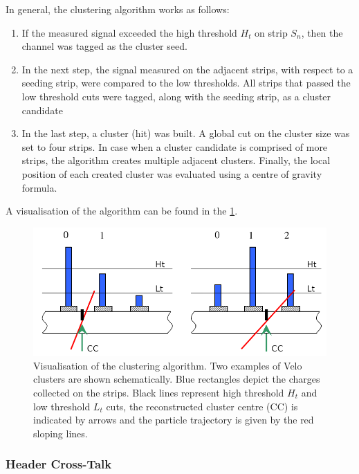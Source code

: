 In general, the clustering algorithm works as follows\cite{Parkes:1074928}:
\begin{enumerate}
  \item If the measured signal exceeded the high threshold $H_{t}$ on strip $S_{n}$, then the channel was tagged as the cluster seed.
  \item In the next step, the signal measured on the adjacent strips, with respect to a seeding strip, were compared to the low thresholds. All strips that passed the low threshold cuts were tagged, along with the seeding strip, as a cluster candidate
  \item In the last step, a cluster (hit) was built. A global cut on the cluster size was set to four strips. In case when a cluster candidate is comprised of more strips, the algorithm creates multiple adjacent clusters. Finally, the local position of each created cluster was evaluated using a centre of gravity formula.
\end{enumerate}

A visualisation of the algorithm can be found in the \ref{plot:velo_clustering}.

\begin{figure}
    \centering
    \includegraphics[width=0.7\linewidth]{figures/chapter2/clustering_algorithm_velo.png}
    \caption{Visualisation of the clustering algorithm. Two examples of Velo clusters are shown schematically. Blue rectangles depict the charges collected on the strips. Black lines represent high threshold $H_{t}$ and low threshold $L_{t}$ cuts, the reconstructed cluster centre (CC) is indicated by arrows and the particle trajectory is given by the red sloping lines.}
    \label{plot:velo_clustering}
\end{figure}

\subsubsection{Header Cross-Talk}
\label{chap2:headercrosstalk}


